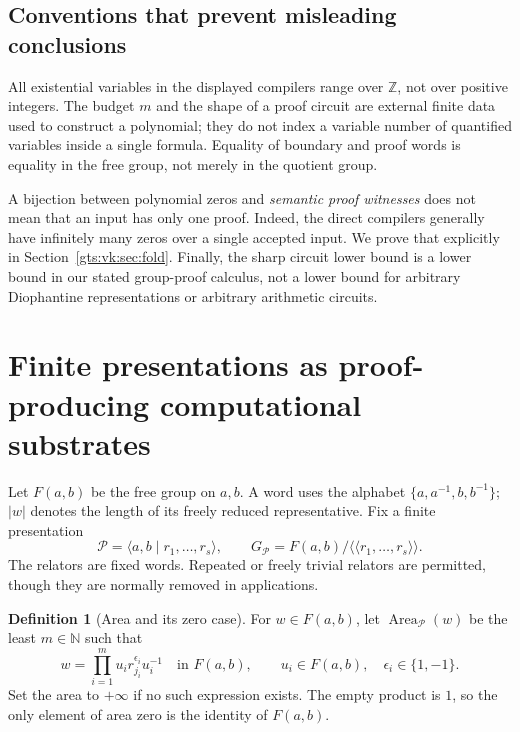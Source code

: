 \documentclass[11pt,letterpaper]{article}
\theoremstyle{definition}
\newtheorem{definition}[theorem]{Definition}
\theoremstyle{remark}
\newcommand{\Z}{\mathbb Z}
\newcommand{\N}{\mathbb N}
\newcommand{\Pp}{\mathcal P}
\newcommand{\F}{F(a,b)}
\newcommand{\Area}{\operatorname{Area}}
\begin{document}
\subsection{Conventions that prevent misleading conclusions}

All existential variables in the displayed compilers range over $\Z$, not over positive integers. The budget $m$ and the shape of a proof circuit are external finite data used to construct a polynomial; they do not index a variable number of quantified variables inside a single formula. Equality of boundary and proof words is equality in the free group, not merely in the quotient group.

A bijection between polynomial zeros and \emph{semantic proof witnesses} does not mean that an input has only one proof. Indeed, the direct compilers generally have infinitely many zeros over a single accepted input. We prove that explicitly in Section~\ref{gts:vk:sec:fold}. Finally, the sharp circuit lower bound is a lower bound in our stated group-proof calculus, not a lower bound for arbitrary Diophantine representations or arbitrary arithmetic circuits.

\section{Finite presentations as proof-producing computational substrates}

Let $\F$ be the free group on $a,b$. A word uses the alphabet
$\{a,a^{-1},b,b^{-1}\}$; $|w|$ denotes the length of its freely reduced representative. Fix a finite presentation
\begin{equation}\label{gts:vk:eq:presentation}
 \Pp=\langle a,b\mid r_1,\ldots,r_s\rangle,
 \qquad G_{\Pp}=\F/\langle\!\langle r_1,\ldots,r_s\rangle\!\rangle.
\end{equation}
The relators are fixed words. Repeated or freely trivial relators are permitted, though they are normally removed in applications.

\begin{definition}[Area and its zero case]\label{gts:vk:def:area}
For $w\in\F$, let $\Area_{\Pp}(w)$ be the least $m\in\N$ such that
\begin{equation}\label{gts:vk:eq:normal-product}
 w=\prod_{i=1}^{m}u_i r_{j_i}^{\epsilon_i}u_i^{-1}
 \quad\text{in }\F,
 \qquad u_i\in\F,\quad \epsilon_i\in\{1,-1\}.
\end{equation}
Set the area to $+\infty$ if no such expression exists. The empty product is $1$, so the only element of area zero is the identity of $\F$.
\end{definition}
\end{document}
